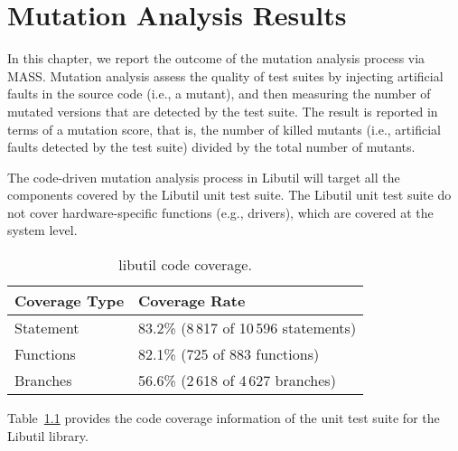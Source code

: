 
\chapter{Mutation Analysis Results}
\label{mass_output}



In this chapter, we report the outcome of the mutation analysis process via MASS. Mutation analysis assess the quality of test suites by injecting artificial faults in the source code (i.e., a mutant), and then measuring the number of mutated versions that are detected by the test suite. The result is reported in terms of a mutation score, that is, the number of killed mutants (i.e., artificial faults detected by the test suite) divided by the total number of mutants.


The code-driven mutation analysis process in Libutil will target all the components covered by the Libutil unit test suite. 
The Libutil unit test suite do not cover hardware-specific functions (e.g., drivers), which are covered at the system level.

\begin{table}[h]
\centering
\begin{tabular}{|l|l|}
\hline
\textbf{Coverage Type} & \textbf{Coverage Rate} \\
\hline
Statement     & 83.2\% (8\,817 of 10\,596 statements)\\
Functions     & 82.1\% (725 of 883 functions)\\
Branches      & 56.6\% (2\,618 of 4\,627 branches)\\
\hline
\end{tabular}
\caption{libutil code coverage.}
\label{table:gslibutil_coverage}
\end{table}

Table~\ref{table:gslibutil_coverage} provides the code coverage information of the unit test suite for the Libutil library. 


